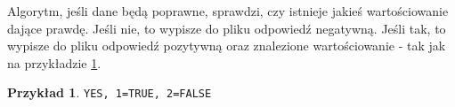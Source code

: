 \documentclass[a4paper,10pt,twoside]{report}
\theoremstyle{definition}
\newtheorem{example}[theorem]{Przykład}
\begin{document}
Algorytm, jeśli dane będą poprawne, sprawdzi, czy istnieje jakieś wartościowanie dające prawdę. Jeśli nie, to wypisze do pliku odpowiedź negatywną. Jeśli tak, to wypisze do pliku odpowiedź pozytywną oraz znalezione wartościowanie - tak jak na przykładzie \ref{exp:przyklad_wyjscia}.

\begin{example} \hfill

\centering \verb|YES, 1=TRUE, 2=FALSE|
\label{exp:przyklad_wyjscia}
\end{example}

\clearpage
\pagestyle{empty}
\printbibliography
\end{document}
